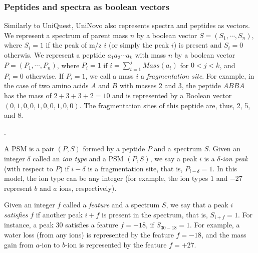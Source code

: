 \subsubsection{Peptides and spectra as boolean vectors} 

Similarly to UniQuest, UniNovo also represents spectra and peptides as vectors. 
We represent a spectrum of parent mass $n$ by a boolean vector $S=(S_1,\cdots,S_n)$, where $S_i=1$ if the peak of m/z $i$ (or simply the peak  $i$) is present and $S_i=0$ otherwis. 
We represent a peptide $a_1a_2\cdots a_k$ with mass $n$ by a boolean vector  $P=(P_1,\cdots,P_n)$, where $P_i=1$ if $i=\sum_{t=1}^j Mass(a_t)$ for $0<j<k$, and $P_i=0$ otherwise. If $P_i=1$, we call a mass $i$ a {\em fragmentation site}. For example, in the case of two amino acids $A$ and $B$ with masses 2 and 3,  the peptide $ABBA$ has the mass of $2+3+3+2=10$ and is represented by a Boolean vector $(0,1,0,0,1,0,0,1,0,0)$. The fragmentation sites of this peptide are, thus, 2, 5, and 8.

. 


A PSM is a pair  $(P,S)$ formed by a peptide $P$ and a spectrum $S$.  Given an integer $\delta$ called an {\em ion type}  and a PSM $(P,S)$, we say a peak  $i$ is a {\em $\delta$-ion  peak} (with respect to $P$) if $i-\delta$ is a fragmentation site, that is, $P_{i-\delta}=1$. In this model, the ion type can be any integer (for example, the ion types $1$ and $-27$ represent $b$ and $a$ ions, respectively). 


Given an integer $f$ called a {\em feature} and a spectrum $S$, we say that a peak  $i$ {\em satisfies} $f$ if another peak $i+f$ is present in the spectrum, that is, $S_{i+f}=1$. For instance, a peak  ${30}$ satisfies a feature $f=-18$, if  $S_{30-18}=1$. 
For example,  a water loss (from any ions) is represented by the feature $f=-18$, and the mass gain from $a$-ion to $b$-ion is represented by the feature $f=+27$. 


